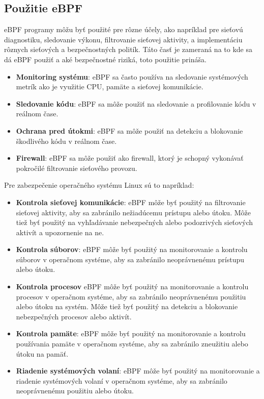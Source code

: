 \subsection{Použitie eBPF}
eBPF programy môžu byť použité pre rôzne účely, ako napríklad pre sieťovú diagnostiku, sledovanie výkonu, filtrovanie sieťovej aktivity, 
a implementáciu rôznych sieťových a bezpečnostných politík. Táto časť je zameraná na to kde sa dá eBPF použiť a aké bezpečnostné riziká, 
toto použitie prináša.
\begin{itemize}
\item \textbf{Monitoring systému}: eBPF sa často používa na sledovanie systémových metrík ako je využitie CPU, pamäte a sieťovej komunikácie.
\item \textbf{Sledovanie kódu}: eBPF sa môže použiť na sledovanie a profilovanie kódu v reálnom čase.
\item \textbf{Ochrana pred útokmi}: eBPF sa môže použiť na detekciu a blokovanie škodlivého kódu v reálnom čase.
\item \textbf{Firewall}: eBPF sa môže použiť ako firewall, ktorý je schopný vykonávať pokročilé filtrovanie sieťového provozu.
\end{itemize}
Pre zabezpečenie operačného systému Linux sú to napríklad:
\begin{itemize}
    \item \textbf{Kontrola sieťovej komunikácie}: eBPF môže byť použitý na filtrovanie sieťovej aktivity, aby sa zabránilo nežiadúcemu prístupu alebo útoku. 
    Môže tiež byť použitý na vyhľadávanie nebezpečných alebo podozrivých sieťových aktivít a upozornenie na ne.
    \item \textbf{Kontrola súborov}: eBPF môže byť použitý na monitorovanie a kontrolu súborov v operačnom systéme, aby sa zabránilo neoprávnenému prístupu alebo útoku.
    \item \textbf{Kontrola procesov} eBPF môže byť použitý na monitorovanie a kontrolu procesov v operačnom systéme, aby sa zabránilo neoprávnenému použitiu 
    alebo útoku na systém. Môže tiež byť použitý na detekciu a blokovanie nebezpečných procesov alebo aktivít.
    \item \textbf{Kontrola pamäte}: eBPF môže byť použitý na monitorovanie a kontrolu používania pamäte v operačnom systéme, aby sa zabránilo zneužitiu 
    alebo útoku na pamäť.
    \item \textbf{Riadenie systémových volaní}: eBPF môže byť použitý na monitorovanie a riadenie systémových volaní v operačnom systéme, 
    aby sa zabránilo neoprávnenému použitiu alebo útoku.
\end{itemize}


